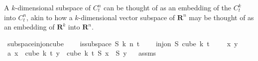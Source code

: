 \begin{isabellebody}
\begin{isamarkuptext}%
A $k$-dimensional subspace of $C^n_t$ can be thought of as an embedding of the $C^k_t$ into $C^n_t$, akin to how a $k$-dimensional vector subspace of $\mathbf{R}^n$ may be thought of as an embedding of $\mathbf{R}^k$ into $\mathbf{R}^n$.%
\end{isamarkuptext}\isamarkuptrue%
\isamarkupfalse%
\ subspace{\isacharunderscore}{\kern0pt}inj{\isacharunderscore}{\kern0pt}on{\isacharunderscore}{\kern0pt}cube{\isacharcolon}{\kern0pt}\ \isanewline
\ \ \ {\isachardoublequoteopen}is{\isacharunderscore}{\kern0pt}subspace\ S\ k\ n\ t{\isachardoublequoteclose}\ \isanewline
\ \ \ {\isachardoublequoteopen}inj{\isacharunderscore}{\kern0pt}on\ S\ {\isacharparenleft}{\kern0pt}cube\ k\ t{\isacharparenright}{\kern0pt}{\isachardoublequoteclose}\isanewline
%
\isadelimproof
%
\endisadelimproof
%
\isatagproof
{}\isamarkupfalse%
\ \isanewline
\ \isamarkupfalse%
\ x\ y\isanewline
\ \isamarkupfalse%
\ a{\isacharcolon}{\kern0pt}\ {\isachardoublequoteopen}x\ {\isasymin}\ cube\ k\ t{\isachardoublequoteclose}\ {\isachardoublequoteopen}y\ {\isasymin}\ cube\ k\ t{\isachardoublequoteclose}\ {\isachardoublequoteopen}S\ x\ {\isacharequal}{\kern0pt}\ S\ y{\isachardoublequoteclose}\isanewline
\ \isamarkupfalse%
\ assms\ \isamarkupfalse%

\end{isabellebody}
